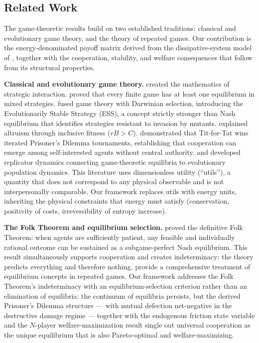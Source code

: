 \documentclass[11pt]{article}
\theoremstyle{plain}
\theoremstyle{definition}
\theoremstyle{remark}
\let\origsubsection\subsection
\renewcommand{\subsection}{\needspace{7\baselineskip}\origsubsection}
\begin{document}
\subsection{Related Work}\label{related-work}

The game-theoretic results build on two established traditions:
classical and evolutionary game theory, and the theory of repeated
games. Our contribution is the energy-denominated payoff matrix derived
from the dissipative-system model of \citep{TC-I, TC-IV}, together with
the cooperation, stability, and welfare consequences that follow from
its structural properties.

\textbf{Classical and evolutionary game theory.} \citet{VonNeumann1944}
created the mathematics of strategic interaction. \citeauthor{Nash1950}
\citetext{\citeyear{Nash1950}; \citeyear{Nash1951}} proved that every
finite game has at least one equilibrium in mixed strategies.
\citet{MaynardSmith1973} fused game theory with Darwinian selection,
introducing the Evolutionarily Stable Strategy (ESS), a concept strictly
stronger than Nash equilibrium that identifies strategies resistant to
invasion by mutants. \citet{Hamilton1964a} explained altruism through
inclusive fitness (\(rB > C\)). \citet{Axelrod1984} demonstrated that
Tit-for-Tat wins iterated Prisoner's Dilemma tournaments, establishing
that cooperation can emerge among self-interested agents without central
authority. \citet{Taylor1978} and \citet{Weibull1995} developed
replicator dynamics connecting game-theoretic equilibria to evolutionary
population dynamics. This literature uses dimensionless utility
(``utils''), a quantity that does not correspond to any physical
observable and is not interpersonally comparable. Our framework replaces
utils with energy units, inheriting the physical constraints that energy
must satisfy (conservation, positivity of costs, irreversibility of
entropy increase).

\textbf{The Folk Theorem and equilibrium selection.}
\citet{Fudenberg1986} proved the definitive Folk Theorem: when agents
are sufficiently patient, any feasible and individually rational outcome
can be sustained as a subgame-perfect Nash equilibrium. This result
simultaneously supports cooperation and creates indeterminacy: the
theory predicts everything and therefore nothing.
\citet{OsborneRubinstein1994} provide a comprehensive treatment of
equilibrium concepts in repeated games. Our framework addresses the Folk
Theorem's indeterminacy with an equilibrium-selection criterion rather
than an elimination of equilibria: the continuum of equilibria persists,
but the derived Prisoner's Dilemma structure --- with mutual defection
net-negative in the destructive damage regime --- together with the
endogenous friction state variable and the \(N\)-player
welfare-maximization result single out universal cooperation as the
unique equilibrium that is also Pareto-optimal and welfare-maximizing.
\end{document}
